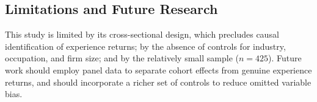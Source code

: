 \documentclass[12pt, a4paper]{article}
\begin{document}
\subsection{Limitations and Future Research}
This study is limited by its cross-sectional design, which precludes causal identification of experience returns; by the absence of controls for industry, occupation, and firm size; and by the relatively small sample ($n = 425$). Future work should employ panel data to separate cohort effects from genuine experience returns, and should incorporate a richer set of controls to reduce omitted variable bias.

\newpage

\end{document}
